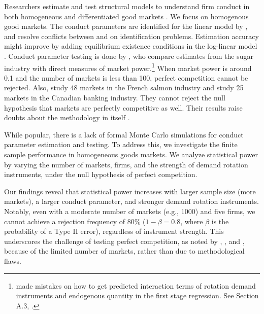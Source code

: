 \documentclass[11pt, a4paper]{article}
\begin{document}
Researchers estimate and test structural models to understand firm conduct in both homogeneous and differentiated good markets \citep{nevoIdentificationOligopolySolution1998, magnolfi2022comparison, duarte2023testing}. 
We focus on homogenous good markets. 
The conduct parameters are identified for the linear model by \citet{bresnahan1982oligopoly}, and \cite{matsumura2023resolving} resolve conflicts between \cite{bresnahan1982oligopoly} and \cite{perloff2012collinearity} on identification problems. 
Estimation accuracy might improve by adding equilibrium existence conditions in the log-linear model \citep{matsumura2023mpec}. 
Conduct parameter testing is done by \cite{genesove1998testing}, who compare estimates from the sugar industry with direct measures of market power.\footnote{\cite{genesove1998testing} made mistakes on how to get predicted interaction terms of rotation demand instruments and endogenous quantity in the first stage regression. See Section A.3, \cite{matsumura2023resolving}.} 
When market power is around 0.1 and the number of markets is less than 100, perfect competition cannot be rejected. 
Also, \cite{steen1999testing} study 48 markets in the French salmon industry and \cite{shaffer1993test} study 25 markets in the Canadian banking industry. 
They cannot reject the null hypothesis that markets are perfectly competitive as well. 
Their results raise doubts about the methodology in itself \citep{shafferMarketPowerCompetition2017}.


While popular, there is a lack of formal Monte Carlo simulations for conduct parameter estimation and testing. 
To address this, we investigate the finite sample performance in homogeneous goods markets. 
We analyze statistical power by varying the number of markets, firms, and the strength of demand rotation instruments, under the null hypothesis of perfect competition.

Our findings reveal that statistical power increases with larger sample size (more markets), a larger conduct parameter, and stronger demand rotation instruments. 
Notably, even with a moderate number of markets (e.g., 1000) and five firms, we cannot achieve a rejection frequency of 80\% ($1-\beta=0.8$, where $\beta$ is the probability of a Type II error), regardless of instrument strength. 
This underscores the challenge of testing perfect competition, as noted by \cite{genesove1998testing}, \cite{steen1999testing}, and \cite{shaffer1993test}, because of the limited number of markets, rather than due to methodological flaws.
\end{document}
